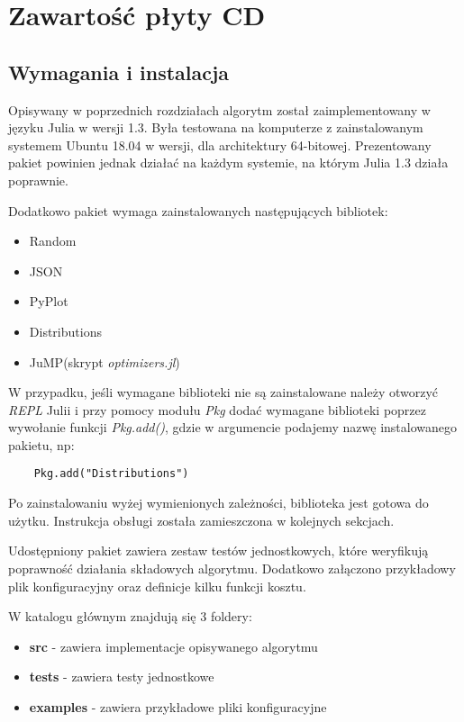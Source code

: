 \chapter{Zawartość płyty CD}
\thispagestyle{chapterBeginStyle}
\label{plytaCD}

\section{Wymagania i instalacja}

Opisywany w poprzednich rozdziałach algorytm został zaimplementowany w języku Julia w wersji 1.3. Była testowana na komputerze z zainstalowanym 
systemem Ubuntu 18.04 w wersji, dla architektury 64-bitowej. Prezentowany pakiet powinien jednak działać na każdym systemie, na którym 
Julia 1.3 działa poprawnie.

Dodatkowo pakiet wymaga zainstalowanych następujących bibliotek:

\begin{itemize}
    \item Random
    \item JSON
    \item PyPlot
    \item Distributions
    \item JuMP(skrypt \textit{optimizers.jl})
\end{itemize}

W przypadku, jeśli wymagane biblioteki nie są zainstalowane należy otworzyć \textit{REPL} Julii i przy pomocy modułu \textit{Pkg} dodać wymagane 
biblioteki poprzez wywołanie funkcji \textit{Pkg.add()}, gdzie w argumencie podajemy nazwę instalowanego pakietu, np:

\begin{lstlisting}
    Pkg.add("Distributions")
\end{lstlisting}

Po zainstalowaniu wyżej wymienionych zależności, biblioteka jest gotowa do użytku. Instrukcja obsługi została zamieszczona w kolejnych sekcjach.

Udostępniony pakiet zawiera zestaw testów jednostkowych, które weryfikują poprawność działania składowych algorytmu. Dodatkowo załączono przykładowy 
plik konfiguracyjny oraz definicje kilku funkcji kosztu.

W katalogu głównym znajdują się 3 foldery:

\begin{itemize}
    \item \textbf{src} - zawiera implementacje opisywanego algorytmu
    \item \textbf{tests} - zawiera testy jednostkowe
    \item \textbf{examples} - zawiera przykładowe pliki konfiguracyjne
\end{itemize}

